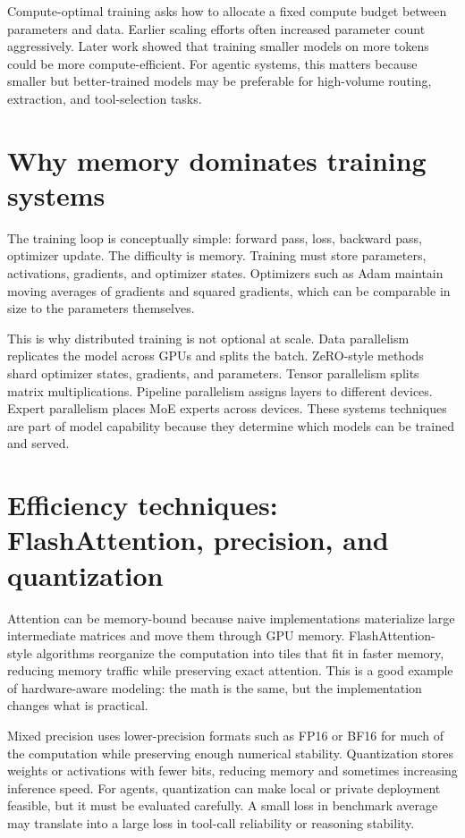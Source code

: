 Compute-optimal training asks how to allocate a fixed compute budget between parameters and data. Earlier scaling efforts often increased parameter count aggressively. Later work showed that training smaller models on more tokens could be more compute-efficient. For agentic systems, this matters because smaller but better-trained models may be preferable for high-volume routing, extraction, and tool-selection tasks.

\section{Why memory dominates training systems}

The training loop is conceptually simple: forward pass, loss, backward pass, optimizer update. The difficulty is memory. Training must store parameters, activations, gradients, and optimizer states. Optimizers such as Adam maintain moving averages of gradients and squared gradients, which can be comparable in size to the parameters themselves.

This is why distributed training is not optional at scale. Data parallelism replicates the model across GPUs and splits the batch. ZeRO-style methods shard optimizer states, gradients, and parameters. Tensor parallelism splits matrix multiplications. Pipeline parallelism assigns layers to different devices. Expert parallelism places MoE experts across devices. These systems techniques are part of model capability because they determine which models can be trained and served.

\section{Efficiency techniques: FlashAttention, precision, and quantization}

Attention can be memory-bound because naive implementations materialize large intermediate matrices and move them through GPU memory. FlashAttention-style algorithms reorganize the computation into tiles that fit in faster memory, reducing memory traffic while preserving exact attention. This is a good example of hardware-aware modeling: the math is the same, but the implementation changes what is practical.

Mixed precision uses lower-precision formats such as FP16 or BF16 for much of the computation while preserving enough numerical stability. Quantization stores weights or activations with fewer bits, reducing memory and sometimes increasing inference speed. For agents, quantization can make local or private deployment feasible, but it must be evaluated carefully. A small loss in benchmark average may translate into a large loss in tool-call reliability or reasoning stability.

